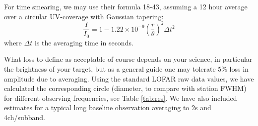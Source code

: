 \documentclass[graybox]{svmult}
\begin{document}
For time smearing, we may use their formula 18-43, assuming a 12 hour average
over a circular UV-coverage with Gaussian tapering:
\begin{equation}
\frac{I}{I_0} = 1-1.22\times 10^{-9}\left(\frac{r}{\theta}\right)^2\Delta t^2
\label{eqn:timeloss}
\end{equation}
where $\Delta t$ is the averaging time in seconds.

What loss to define as acceptable of course depends on your science, in
particular the brightness of your target, but as a general guide one may
tolerate 5\% loss in amplitude due to averaging. Using the standard LOFAR raw
data values, we have calculated the corresponding circle (diameter, to compare
with station FWHM) for different observing frequencies, see Table
\ref{tab:res}. We have also included estimates for a typical long baseline 
observation averaging to 2s and 4ch/subband.

\end{document}
